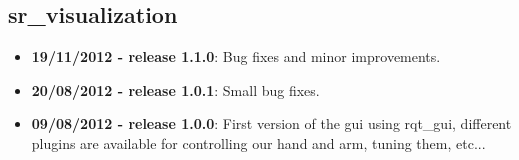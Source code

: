 
\subsection{sr\_visualization}
\label{sec:sr-visualization-changelog}

\begin{itemize}
\item \textbf{19/11/2012 - release 1.1.0}: Bug fixes and minor improvements.
\item \textbf{20/08/2012 - release 1.0.1}: Small bug fixes.
\item \textbf{09/08/2012 - release 1.0.0}: First version of the gui using rqt\_gui, different plugins are available for controlling our hand and arm, tuning them, etc...
\end{itemize}